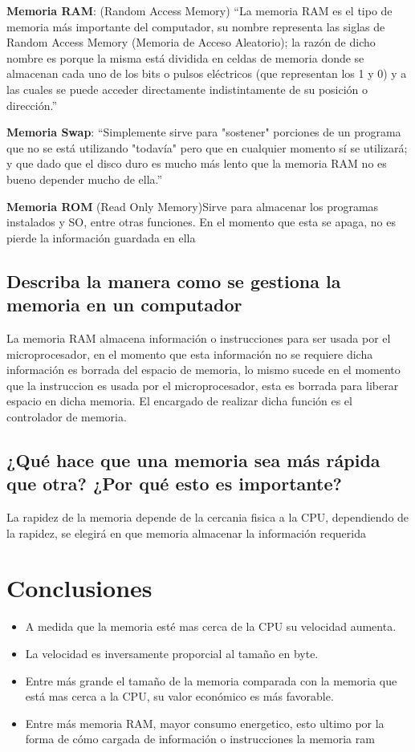 \documentclass[12pt,letterpaper]{article}
\begin{document}
        \textbf{Memoria RAM}: (Random Access Memory) ``La memoria RAM es el tipo de memoria más importante del computador, su nombre representa las siglas de Random Access Memory (Memoria de Acceso Aleatorio); la razón de dicho nombre es porque la misma está dividida en celdas de memoria donde se almacenan cada uno de los bits o pulsos eléctricos (que representan los 1 y 0) y a las cuales se puede acceder directamente
        indistintamente de su posición o dirección.''\cite{GuiaProfesor}

        \textbf{Memoria Swap}: ``Simplemente sirve para "sostener" porciones de un programa que no se está utilizando "todavía" pero que en cualquier momento sí se utilizará; y que dado que el disco duro es mucho más lento que la memoria RAM no es bueno depender mucho de ella.''\cite{GuiaProfesor}

        \textbf{Memoria ROM} (Read Only Memory)Sirve para almacenar los programas instalados y SO, entre otras funciones. En el momento que esta se apaga, no es pierde la información guardada en ella

        
    \subsection{Describa la manera como se gestiona la memoria en un computador}
        La memoria RAM almacena información o instrucciones para ser usada por el microprocesador, en el momento que esta información no se requiere dicha información es borrada del espacio de memoria, lo mismo sucede en el momento que la instruccion es usada por el microprocesador, esta es borrada para liberar espacio en dicha memoria. El encargado de realizar dicha función es el controlador de memoria.       


    \subsection{¿Qué hace que una memoria sea más rápida que otra? ¿Por qué esto es importante?}
        La rapidez de la memoria depende de la cercania fisica a la CPU, dependiendo de la rapidez, se elegirá en que memoria almacenar la información requerida 
        
\newpage

\section{Conclusiones}
    \begin{itemize}
     \item A medida que la memoria esté mas cerca de la CPU su velocidad aumenta.
     \item La velocidad es inversamente proporcial al tamaño en byte.
     \item Entre más grande el tamaño de la memoria comparada con la memoria que está mas cerca a la CPU, su valor económico es más favorable.
     \item Entre más memoria RAM, mayor consumo energetico, esto ultimo por la forma de cómo cargada de información o instrucciones la memoria ram
    \end{itemize}

\newpage



\end{document}
